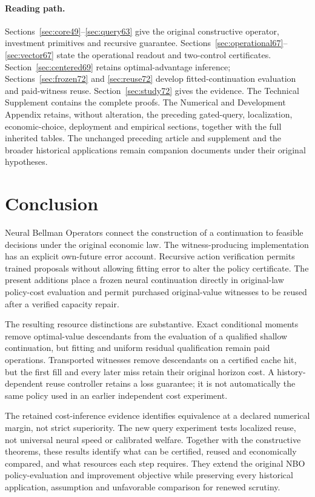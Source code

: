 \documentclass[ecta,nameyear,draft]{econsocart}
\begin{document}
\paragraph{Reading path.}
Sections~\ref{sec:core49}--\ref{sec:query63} give the original constructive operator, investment primitives and recursive guarantee. Sections~\ref{sec:operational67}--\ref{sec:vector67} state the operational readout and two-control certificates. Section~\ref{sec:centered69} retains optimal-advantage inference; Sections~\ref{sec:frozen72} and \ref{sec:reuse72} develop fitted-continuation evaluation and paid-witness reuse. Section~\ref{sec:study72} gives the evidence. The Technical Supplement contains the complete proofs. The Numerical and Development Appendix retains, without alteration, the preceding gated-query, localization, economic-choice, deployment and empirical sections, together with the full inherited tables. The unchanged preceding article and supplement and the broader historical applications remain companion documents under their original hypotheses.










\section{Conclusion}\label{sec:conclusion65}
Neural Bellman Operators connect the construction of a continuation to feasible decisions under the original economic law. The witness-producing implementation has an explicit own-future error account. Recursive action verification permits trained proposals without allowing fitting error to alter the policy certificate. The present additions place a frozen neural continuation directly in original-law policy-cost evaluation and permit purchased original-value witnesses to be reused after a verified capacity repair.

The resulting resource distinctions are substantive. Exact conditional moments remove optimal-value descendants from the evaluation of a qualified shallow continuation, but fitting and uniform residual qualification remain paid operations. Transported witnesses remove descendants on a certified cache hit, but the first fill and every later miss retain their original horizon cost. A history-dependent reuse controller retains a loss guarantee; it is not automatically the same policy used in an earlier independent cost experiment.

The retained cost-inference evidence identifies equivalence at a declared numerical margin, not strict superiority. The new query experiment tests localized reuse, not universal neural speed or calibrated welfare. Together with the constructive theorems, these results identify what can be certified, reused and economically compared, and what resources each step requires. They extend the original NBO policy-evaluation and improvement objective while preserving every historical application, assumption and unfavorable comparison for renewed scrutiny.


\end{document}
